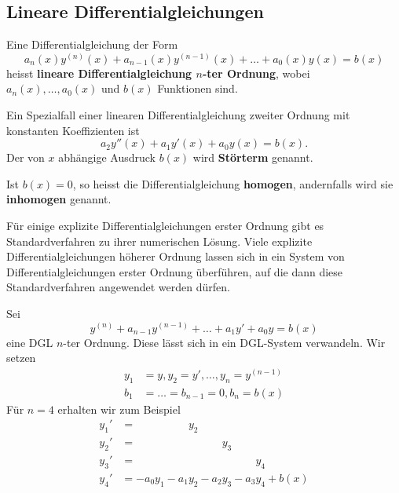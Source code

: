 \documentclass[%
11pt,%
twoside,%
titlepage,%
german,%
headsepline%
]{scrartcl}
\begin{document}
\subsection{Lineare Differentialgleichungen}

\begin{defn}
Eine Differentialgleichung der Form
$$a_n(x)y^{(n)}(x)+a_{n-1}(x)y^{(n-1)}(x)+%
\dots+a_0(x)y(x)=b(x)$$
heisst \textbf{lineare Differentialgleichung $n$-ter Ordnung}, wobei $a_n(x),\dots,a_0(x)$ und $b(x)$ Funktionen sind.
\end{defn}
\begin{bsp}
Ein Spezialfall einer linearen Differentialgleichung zweiter Ordnung mit konstanten Koeffizienten ist
$$a_2y''(x)+a_1y'(x)+a_0y(x)=b(x).$$
Der von $x$ abh\"angige Ausdruck $b(x)$ wird \textbf{St\"orterm} genannt.
\end{bsp}
\begin{defn}
Ist $b(x)=0$, so heisst die Differentialgleichung \textbf{homogen}, andernfalls wird sie \textbf{inhomogen} genannt.
\end{defn}
\begin{bem}
F\"ur einige explizite Differentialgleichungen erster Ordnung gibt es Standardverfahren zu ihrer numerischen L\"osung. Viele explizite Differentialgleichungen h\"oherer Ordnung lassen sich in ein System von Differentialgleichungen erster Ordnung \"uberf\"uhren, auf die dann diese Standardverfahren angewendet werden d\"urfen.
\end{bem}
\begin{bsp}
Sei
$$y^{(n)}+a_{n-1}y^{(n-1)}+\dots+a_1y'+a_0y=b(x)$$
eine DGL $n$-ter Ordnung. Diese l\"asst sich in ein DGL-System verwandeln. Wir setzen
\begin{align*}
y_1&=y, y_2=y',\dots,y_n=y^{(n-1)}\\
b_1&=\dots=b_{n-1}=0, b_n=b(x)
\end{align*}
F\"ur $n=4$ erhalten wir zum Beispiel
\begin{align*}
y_1'&=\phantom{-a_0y_1-a_1}y_2\\
y_2'&=\phantom{-a_0y_1-a_1y_2-a_2}y_3\\
y_3'&=\phantom{-a_0y_1-a_1y_2-a_2y_3-a_3}y_4\\
y_4'&=-a_0y_1-a_1y_2-a_2y_3-a_3y_4+b(x)
\end{align*}
\end{bsp}
\end{document}
